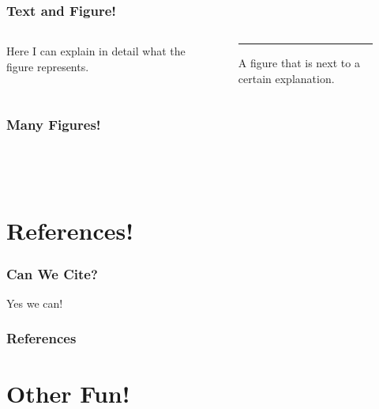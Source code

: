 \documentclass{beamer}
\begin{document}
\begin{frame}
    \frametitle{Text and Figure!}

    \begin{columns}
        \begin{column}{0.5\textwidth}
            Here I can explain in detail what the figure represents.
        \end{column}
        \begin{column}{0.5\textwidth}
            \begin{figure}
                \centering
                \rule{0.7\textwidth}{0.7\textwidth}
                \caption{A figure that is next to a certain explanation.}
            \end{figure}
        \end{column}
    \end{columns}
\end{frame}

\begin{frame}
    \frametitle{Many Figures!}

    \begin{columns}[t]
        \centering
        \rule{0.6\textwidth}{0.6\textwidth}\\[1em]
        \rule{0.6\textwidth}{0.6\textwidth}
        \centering
        \rule{0.6\textwidth}{0.6\textwidth}\\[1em]
        \rule{0.6\textwidth}{0.6\textwidth}
    \end{columns}
\end{frame}

\section{References!}

\begin{frame}
    \frametitle{Can We Cite?}
    Yes we can!
    \cite{knuth-fa}
\end{frame}

\begin{frame}[allowframebreaks]
    \frametitle{References}
    \nocite{*}
    
    
\end{frame}

\section{Other Fun!}
\end{document}
